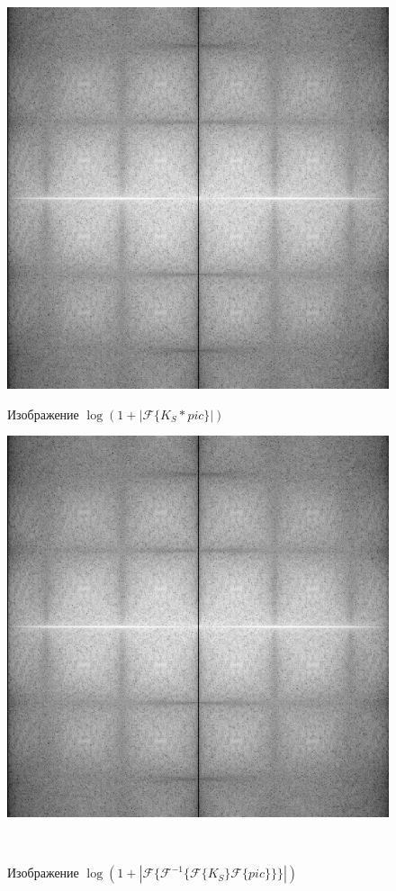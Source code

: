 \documentclass[a4paper]{article}
\begin{document}
\begin{figure}[H]
    \begin{minipage}{0.49\textwidth}
        \centering \includegraphics[width=\textwidth]{2/abs_fourier_log_norm_img_laplacian.png}
        \caption{Изображение $\log{(1+|\mathcal{F}\{K_S*pic\}|)}$}
    \end{minipage}\hfill
    \begin{minipage}{0.49\textwidth}
        \centering \includegraphics[width=\textwidth]{2/abs_fourier_log_norm_img_laplacian1.png}
        \caption{Изображение $\log{(1+|\mathcal{F}\{\mathcal{F}^{-1}\{ \mathcal{F}\{K_S\}\mathcal{F}\{pic\}\}\}|)}$}
    \end{minipage}\\[1em]
\end{figure}\noindent\
\end{document}
